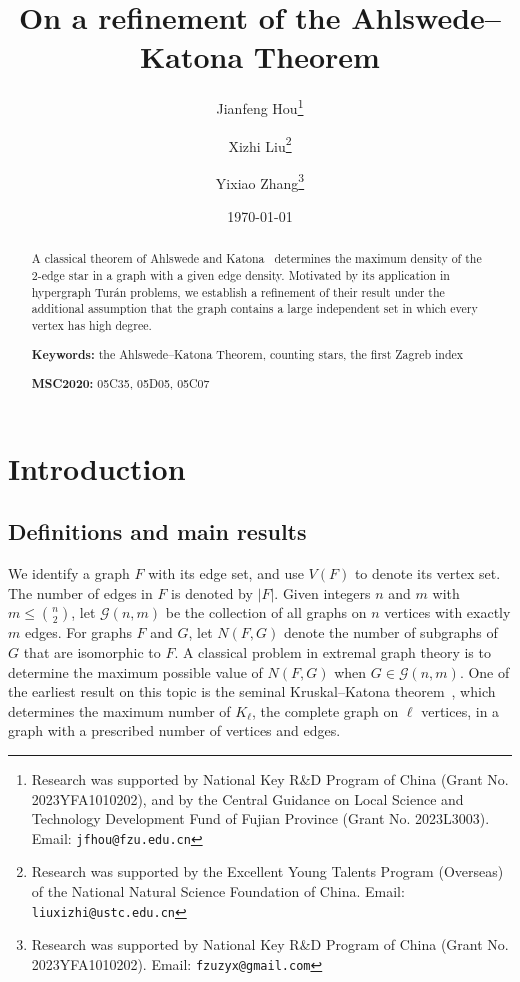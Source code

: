 \documentclass[11pt,a4paper]{article}
\begin{document}
%
\title{\bf\Large On a refinement of the Ahlswede--Katona Theorem}
%
\date{\today}
%
\author[1]{Jianfeng Hou\thanks{Research was supported by National Key R\&D Program of China (Grant No. 2023YFA1010202), and by the Central Guidance on Local Science and Technology Development Fund of Fujian Province (Grant No. 2023L3003). Email: \texttt{jfhou@fzu.edu.cn}}}
\author[2]{Xizhi Liu\thanks{Research was supported by the Excellent Young Talents Program
(Overseas) of the National Natural Science Foundation of China. Email: \texttt{liuxizhi@ustc.edu.cn}}}
\author[1]{Yixiao Zhang\thanks{Research was supported by National Key R\&D Program of China (Grant No. 2023YFA1010202). Email: \texttt{fzuzyx@gmail.com}}}
%           
\maketitle
\begin{abstract}
    A classical theorem of Ahlswede and Katona~\cite{AK78} determines the maximum density of the $2$-edge star in a graph with a given edge density. Motivated by its application in hypergraph Tur\'{a}n problems, we establish a refinement of their result under the additional assumption that the graph contains a large independent set in which every vertex has high degree. 
    
\medskip

\noindent\textbf{Keywords:} the Ahlswede--Katona Theorem, counting stars, the first Zagreb index

\medskip

\noindent\textbf{MSC2020:} 05C35, 05D05, 05C07
\end{abstract}


\section{Introduction}\label{Sec:Introduction}
%
\subsection{Definitions and main results}
%
We identify a graph $F$ with its edge set, and use $V(F)$ to denote its vertex set. 
The number of edges in $F$ is denoted by $|F|$. 
Given integers $n$ and $m$ with $m \le \binom{n}{2}$, let $\mathcal{G}(n,m)$ be the collection of all graphs on $n$ vertices with exactly $m$ edges. 
For graphs $F$ and $G$, let $N(F,G)$ denote the number of subgraphs of $G$ that are isomorphic to $F$. 
A classical problem in extremal graph theory is to determine the maximum possible value of $N(F,G)$ when $G \in \mathcal{G}(n,m)$. 
One of the earliest result on this topic is the seminal Kruskal--Katona theorem~\cite{Kru63,Kat68}, which determines the maximum number of $K_{\ell}$, the complete graph on $\ell$ vertices, in a graph with a prescribed number of vertices and edges. 
\end{document}
